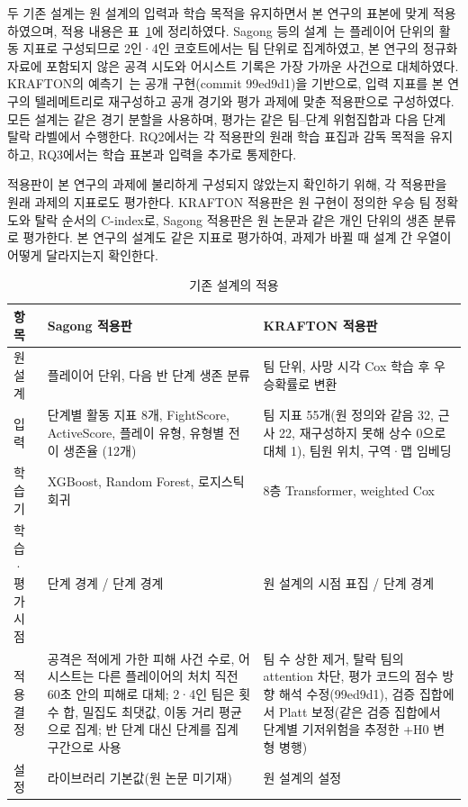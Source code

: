 두 기존 설계는 원 설계의 입력과 학습 목적을 유지하면서 본 연구의 표본에 맞게 적용하였으며, 적용 내용은 표~\ref{tab:adapt}에 정리하였다.
Sagong 등의 설계~\cite{Sagong25a}는 플레이어 단위의 활동 지표로 구성되므로 2인·4인 코호트에서는 팀 단위로 집계하였고, 본 연구의 정규화 자료에 포함되지 않은 공격 시도와 어시스트 기록은 가장 가까운 사건으로 대체하였다.
KRAFTON의 예측기~\cite{KRAFTON}는 공개 구현(commit 99ed9d1)을 기반으로, 입력 지표를 본 연구의 텔레메트리로 재구성하고 공개 경기와 평가 과제에 맞춘 적용판으로 구성하였다.
모든 설계는 같은 경기 분할을 사용하며, 평가는 같은 팀--단계 위험집합과 다음 단계 탈락 라벨에서 수행한다.
RQ2에서는 각 적용판의 원래 학습 표집과 감독 목적을 유지하고, RQ3에서는 학습 표본과 입력을 추가로 통제한다.

적용판이 본 연구의 과제에 불리하게 구성되지 않았는지 확인하기 위해, 각 적용판을 원래 과제의 지표로도 평가한다.
KRAFTON 적용판은 원 구현이 정의한 우승 팀 정확도와 탈락 순서의 C-index로, Sagong 적용판은  원 논문과 같은 개인 단위의 생존 분류로 평가한다.
본 연구의 설계도 같은 지표로 평가하여, 과제가 바뀔 때 설계 간 우열이 어떻게 달라지는지 확인한다.

\begin{table}[t]
\centering
\caption{기존 설계의 적용}
\label{tab:adapt}
\small
\begin{tabular}{p{1.3cm}p{3.1cm}p{3.1cm}}
\hline
항목 & Sagong 적용판 & KRAFTON 적용판 \\
\hline
원 설계 & 플레이어 단위, 다음 반 단계 생존 분류 & 팀 단위, 사망 시각 Cox 학습 후 우승확률로 변환 \\
입력 & 단계별 활동 지표 8개, FightScore, ActiveScore, 플레이 유형, 유형별 전이 생존율 (12개) & 팀 지표 55개(원 정의와 같음 32, 근사 22, 재구성하지 못해 상수 0으로 대체 1), 팀원 위치, 구역·맵 임베딩 \\
학습기 & XGBoost, Random Forest, 로지스틱 회귀 & 8층 Transformer, weighted Cox \\
학습·평가 시점 & 단계 경계 / 단계 경계 & 원 설계의 시점 표집 / 단계 경계 \\
적용 결정 & 공격은 적에게 가한 피해 사건 수로, 어시스트는 다른 플레이어의 처치 직전 60초 안의 피해로 대체; 2·4인 팀은 횟수 합, 밀집도 최댓값, 이동 거리 평균으로 집계; 반 단계 대신 단계를 집계 구간으로 사용 & 팀 수 상한 제거, 탈락 팀의 attention 차단, 평가 코드의 점수 방향 해석 수정(99ed9d1), 검증 집합에서 Platt 보정(같은 검증 집합에서 단계별 기저위험을 추정한 +H0 변형 병행) \\
설정 & 라이브러리 기본값(원 논문 미기재) & 원 설계의 설정 \\
\hline
\end{tabular}
\end{table}

